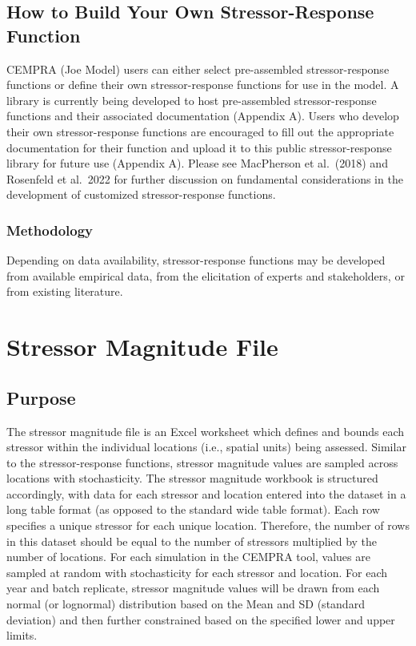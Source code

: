 \documentclass[
  letterpaper,
  DIV=11,
  numbers=noendperiod]{scrreprt}
\begin{document}
\hypertarget{how-to-build-your-own-stressor-response-function}{%
\subsection{How to Build Your Own Stressor-Response
Function}\label{how-to-build-your-own-stressor-response-function}}

CEMPRA (Joe Model) users can either select pre-assembled
stressor-response functions or define their own stressor-response
functions for use in the model. A library is currently being developed
to host pre-assembled stressor-response functions and their associated
documentation (Appendix A). Users who develop their own
stressor-response functions are encouraged to fill out the appropriate
documentation for their function and upload it to this public
stressor-response library for future use (Appendix A). Please see
MacPherson et al.~(2018) and Rosenfeld et al.~2022 for further
discussion on fundamental considerations in the development of
customized stressor-response functions.

\hypertarget{methodology}{%
\subsubsection{Methodology}\label{methodology}}

Depending on data availability, stressor-response functions may be
developed from available empirical data, from the elicitation of experts
and stakeholders, or from existing literature.

\hypertarget{stressor-magnitude-file}{%
\section{Stressor Magnitude File}\label{stressor-magnitude-file}}

\hypertarget{purpose-2}{%
\subsection{Purpose}\label{purpose-2}}

The stressor magnitude file is an Excel worksheet which defines and
bounds each stressor within the individual locations (i.e., spatial
units) being assessed. Similar to the stressor-response functions,
stressor magnitude values are sampled across locations with
stochasticity. The stressor magnitude workbook is structured
accordingly, with data for each stressor and location entered into the
dataset in a long table format (as opposed to the standard wide table
format). Each row specifies a unique stressor for each unique location.
Therefore, the number of rows in this dataset should be equal to the
number of stressors multiplied by the number of locations. For each
simulation in the CEMPRA tool, values are sampled at random with
stochasticity for each stressor and location. For each year and batch
replicate, stressor magnitude values will be drawn from each normal (or
lognormal) distribution based on the Mean and SD (standard deviation)
and then further constrained based on the specified lower and upper
limits.
\end{document}
